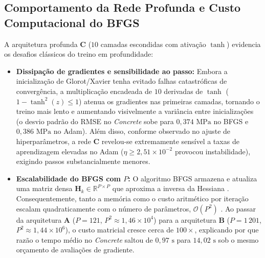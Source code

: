 \documentclass[conference]{IEEEtran}
\begin{document}
\subsection{Comportamento da Rede Profunda e Custo Computacional do BFGS}
A arquitetura profunda \textbf{C} ($10$ camadas escondidas com ativação $\tanh$) evidencia os desafios clássicos do treino em profundidade:
\begin{itemize}
    \item \textbf{Dissipação de gradientes e sensibilidade ao passo:} Embora a inicialização de Glorot/Xavier \cite{b8} tenha evitado falhas catastróficas de convergência, a multiplicação encadeada de $10$ derivadas de $\tanh$ ($1 - \tanh^2(z) \le 1$) atenua os gradientes nas primeiras camadas, tornando o treino mais lento e aumentando visivelmente a variância entre inicializações (o desvio padrão do RMSE no \textit{Concrete} sobe para $0{,}374\text{ MPa}$ no BFGS e $0{,}386\text{ MPa}$ no Adam). Além disso, conforme observado no ajuste de hiperparâmetros, a rede \textbf{C} revelou-se extremamente sensível a taxas de aprendizagem elevadas no Adam ($\eta \ge 2{,}51 \times 10^{-2}$ provocou instabilidade), exigindo passos substancialmente menores.
    \item \textbf{Escalabilidade do BFGS com $P$:} O algoritmo BFGS armazena e atualiza uma matriz densa $\mathbf{H}_k \in \mathbb{R}^{P \times P}$ que aproxima a inversa da Hessiana \cite{b9}. Consequentemente, tanto a memória como o custo aritmético por iteração escalam quadraticamente com o número de parâmetros, $\mathcal{O}(P^2)$ \cite{b9}. Ao passar da arquitetura \textbf{A} ($P = 121$, $P^2 \approx 1{,}46 \times 10^4$) para a arquitetura \textbf{B} ($P = 1\,201$, $P^2 \approx 1{,}44 \times 10^6$), o custo matricial cresce cerca de $100\times$, explicando por que razão o tempo médio no \textit{Concrete} saltou de $0{,}97\text{ s}$ para $14{,}02\text{ s}$ sob o mesmo orçamento de avaliações de gradiente.
\end{itemize}
\end{document}
